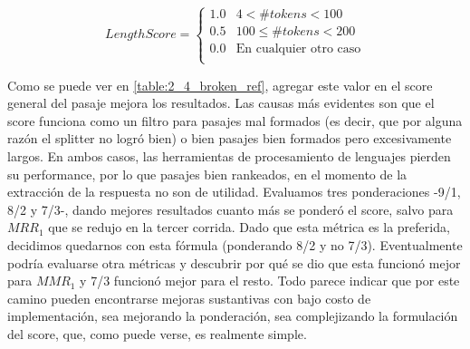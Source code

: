 \begin{equation*}
    LengthScore = \begin{cases}
               1.0     & 4 <   \#tokens < 100\\
               0.5     & 100 \leq \#tokens < 200 \\
               0.0     & \text{En cualquier otro caso}\\
           \end{cases}
\end{equation*}


Como se puede ver en \ref{table:2_4_broken_ref}, agregar este valor en el score general del pasaje mejora los resultados. Las causas más evidentes son que el score funciona como un filtro para pasajes mal formados (es decir, que por alguna razón el splitter no logró  bien) o bien pasajes bien formados pero excesivamente largos. En ambos casos, las herramientas de procesamiento de lenguajes pierden su performance, por lo que pasajes bien rankeados, en el momento de la extracción de la respuesta no son de utilidad. Evaluamos tres ponderaciones -9/1, 8/2 y 7/3-, dando mejores resultados cuanto más se ponderó el score, salvo para $MRR_1$ que se redujo en la tercer corrida. Dado que esta métrica es la preferida, decidimos quedarnos con esta fórmula (ponderando 8/2 y no 7/3). Eventualmente podría evaluarse otra métricas y descubrir por qué se dio que esta funcionó mejor para $MMR_1$ y 7/3 funcionó mejor para el resto. Todo parece indicar que por este camino pueden encontrarse mejoras sustantivas con bajo costo de implementación, sea mejorando la ponderación, sea complejizando la formulación del score, que, como puede verse, es realmente simple.


